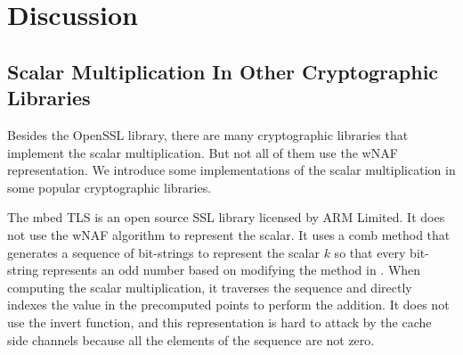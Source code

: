 \section{Discussion}
\label{sec:discussion}

\subsection{Scalar Multiplication In Other Cryptographic Libraries}
Besides the OpenSSL library, there are many cryptographic libraries that implement the scalar multiplication.
But not all of them use the wNAF representation.
We introduce some implementations of the scalar multiplication in some popular cryptographic libraries.

The mbed TLS \cite{polarssl} is an open source SSL library licensed by ARM Limited.
It does not use the wNAF algorithm to represent the scalar.
It uses a comb method that generates a sequence of bit-strings to represent the scalar $k$ so that every bit-string represents an odd number based on modifying the method in \cite{Hedabou2004ACM}.
When computing the scalar multiplication, it traverses the sequence and directly indexes the value in the precomputed points to perform the addition.
It does not use the invert function, 
and this representation is hard to attack by the cache side channels because all the elements of the sequence are not zero. 






